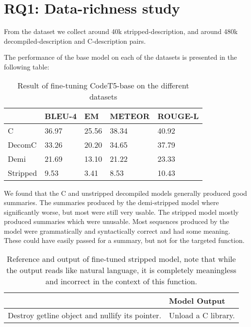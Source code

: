 \section{RQ1: Data-richness study}
From the dataset we collect around 40k stripped-description, and around 480k decompiled-description and C-description pairs. 

The performance of the base model on each of the datasets is presented in the following table:
\label{tab:duplicated}
\begin{table}[!h]
\centering
\begin{tabular}{lllll} 
\hline
\rowcolor[rgb]{0.761,0.761,0.761} \multicolumn{1}{|l}{\textbf{Duplicated}} & BLEU-4 & EM    & METEOR & \multicolumn{1}{l|}{ROUGE-L}  \\ 
\hline
C                                                                          & 36.97  & 25.56 & 38.34  &  40.92                            \\
DecomC                                                                     & 33.26  & 20.20 & 34.65  & 37.79                             \\
Demi                                                                       & 21.69  & 13.10 & 21.22  &  23.33                             \\
Stripped                                                                   & 9.53   & 3.41  & 8.53  &  10.43                          
\end{tabular}
\caption{Result of fine-tuning CodeT5-base on the different datasets}
\end{table}

We found that the C and unstripped decompiled models generally produced good summaries. The summaries produced by the demi-stripped model where significantly worse, but most were still very usable. The stripped model mostly produced summaries which were unusable. Most sequences produced by the model were grammatically and syntactically correct and had some meaning. These could have easily passed for a summary, but not for the targeted function.

\label{tab:syntax}
\begin{table}[!h]
\centering
\begin{tabular}{ll}
\hline
\rowcolor[HTML]{9B9B9B} 
\multicolumn{1}{|l}{\cellcolor[HTML]{9B9B9B}Reference} & \multicolumn{1}{l|}{\cellcolor[HTML]{9B9B9B}Model Output}    \\ \hline
Destroy getline object and nullify its pointer.               & Unload a C library.
\end{tabular}
\caption{Reference and output of fine-tuned stripped model, note that while the output reads like natural language, it is completely meaningless and incorrect in the context of this function.}
\end{table}

